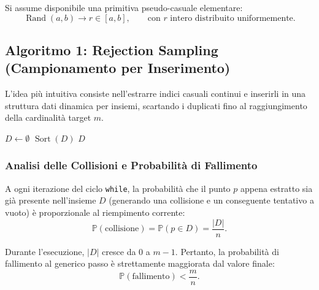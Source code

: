 Si assume disponibile una primitiva pseudo-casuale elementare:
\begin{equation}
  \operatorname{Rand}(a, b) \to r \in [a, b], \qquad \text{con } r \text{ intero distribuito uniformemente.}
\end{equation}

\FloatBarrier
\subsection{Algoritmo 1: Rejection Sampling (Campionamento per Inserimento)}
L'idea più intuitiva consiste nell'estrarre indici casuali continui e inserirli in una struttura dati dinamica per insiemi, scartando i duplicati fino al raggiungimento della cardinalità target $m$.

\begin{algorithm}[H]
  \caption{Rejection Sampling per Inserimento Casuale}
  \label{alg:rejection-sampling}
  $D \leftarrow \emptyset$\;
  $\operatorname{Sort}(D)$\;
  \Return $D$\;
\end{algorithm}

\subsubsection{Analisi delle Collisioni e Probabilità di Fallimento}
A ogni iterazione del ciclo \texttt{while}, la probabilità che il punto $p$ appena estratto sia già presente nell'insieme $D$ (generando una collisione e un conseguente tentativo a vuoto) è proporzionale al riempimento corrente:
\begin{equation}
  \mathbb{P}(\text{collisione}) = \mathbb{P}(p \in D) = \frac{|D|}{n}.
\end{equation}

Durante l'esecuzione, $|D|$ cresce da $0$ a $m - 1$. Pertanto, la probabilità di fallimento al generico passo è strettamente maggiorata dal valore finale:
\begin{equation}
  \mathbb{P}(\text{fallimento}) < \frac{m}{n}.
\end{equation}

